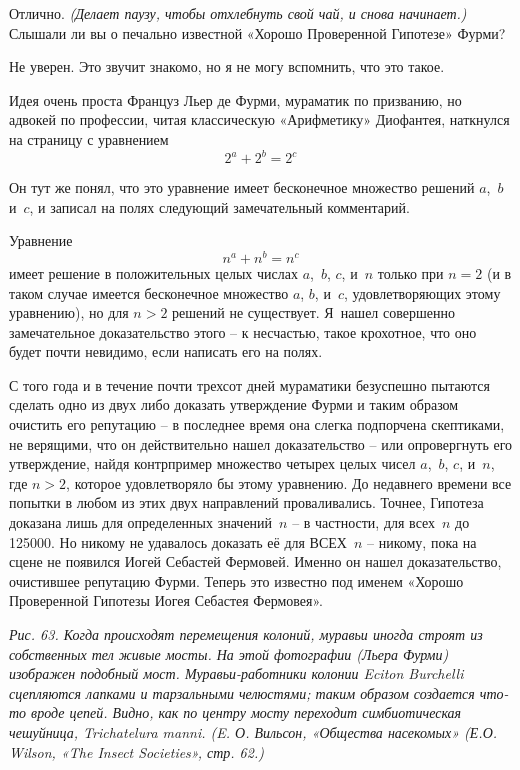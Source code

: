 \documentclass[../main.tex]{subfiles}
\begin{document}
\begin{dialogue}
 Отлично. \emph{(Делает паузу, чтобы отхлебнуть свой чай, и снова начинает.)} Слышали ли вы о печально известной «Хорошо Проверенной Гипотезе» Фурми?

 Не уверен. Это звучит знакомо, но я не могу вспомнить, что это такое.

 Идея очень проста Француз Льер де Фурми, мураматик по призванию, но адвокей по профессии, читая классическую «Арифметику» Диофантея, наткнулся на страницу с уравнением
\[
    2^{a} + 2^{b} = 2^{c}
\]

Он тут же понял, что это уравнение имеет бесконечное множество решений $a$,~$b$ и~$c$, и записал на полях следующий замечательный комментарий.

Уравнение
\[
    n^{a} + n^{b} = n^{c}
\]
имеет решение в положительных целых числах $a$,~$b$, $c$, и~$n$ только при $n = 2$ (и в таком случае имеется бесконечное множество $a$, $b$, и~$c$, удовлетворяющих этому уравнению), но для $n > 2$ решений не существует. Я~нашел совершенно замечательное доказательство этого \--- к несчастью, такое крохотное, что оно будет почти невидимо, если написать его на полях.

С того года и в течение почти трехсот дней мураматики безуспешно пытаются сделать одно из двух либо доказать утверждение Фурми и таким образом очистить его репутацию \--- в последнее время она слегка подпорчена скептиками, не верящими, что он действительно нашел доказательство \--- или опровергнуть его утверждение, найдя контрпример множество четырех целых чисел $a$,~$b$, $c$, и~$n$, где $n > 2$, которое удовлетворяло бы этому уравнению. До недавнего времени все попытки в любом из этих двух направлений проваливались. Точнее, Гипотеза доказана лишь для определенных значений~$n$ \--- в частности, для всех~$n$ до \num{125 000}. Но никому не удавалось доказать её для ВСЕХ~$n$ \--- никому, пока на сцене не появился Иогей Себастей Фермовей. Именно он нашел доказательство, очистившее репутацию Фурми. Теперь это известно под именем «Хорошо Проверенной Гипотезы Иогея Себастея Фермовея».

\emph{Рис. 63. Когда происходят перемещения колоний, муравьи иногда строят из собственных тел живые мосты. На этой фотографии (Льера Фурми) изображен подобный мост. Муравьи-работники колонии Eciton Burchelli сцепляются лапками и тарзальными челюстями; таким образом создается что-то вроде цепей. Видно, как по центру мосту переходит симбиотическая чешуйница, Trichatelura manni. (E. О. Вильсон, «Общества насекомых» (Е.О. Wilson, «The Insect Societies», стр. 62.)}


\end{dialogue}
\end{document}
